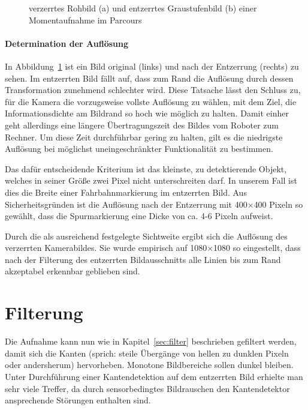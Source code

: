 \begin{figure}[htbp] %
  \centering
  \hfill
  \caption{verzerrtes Rohbild (a) und entzerrtes Graustufenbild (b) einer Momentaufnahme im Parcours}
\label{fig:bildvorverarbeitung_entzerren}
\end{figure} 

\paragraph{Determination der Auflösung}
In Abbildung~\ref{fig:bildvorverarbeitung_entzerren} ist ein Bild original (links) und nach der Entzerrung (rechts) zu sehen. Im entzerrten Bild fällt auf, dass zum Rand die Auflösung durch dessen Transformation zunehmend schlechter wird. Diese Tatsache lässt den Schluss zu, für die Kamera die vorzugsweise vollste Auflösung zu wählen, mit dem Ziel, die Informationsdichte am Bildrand so hoch wie möglich zu halten. Damit einher geht allerdings eine längere Übertragungszeit des Bildes vom Roboter zum Rechner. Um diese Zeit durchführbar gering zu halten, gilt es die niedrigste Auflösung bei möglichst uneingeschränkter Funktionalität zu bestimmen. 

Das dafür entscheidende Kriterium ist das kleinste, zu detektierende Objekt, welches in seiner Größe zwei Pixel nicht unterschreiten darf. In unserem Fall ist dies die Breite einer Fahrbahnmarkierung im entzerrten Bild. Aus Sicherheitsgründen ist die Auflösung nach der Entzerrung mit 400\( \times \)400 Pixeln so gewählt, dass die Spurmarkierung eine Dicke von ca. 4-6 Pixeln aufweist. 

Durch die als ausreichend festgelegte Sichtweite ergibt sich die Auflösung des verzerrten Kamerabildes. Sie wurde empirisch auf 1080\( \times \)1080 so eingestellt, dass nach der Filterung des entzerrten Bildausschnitts alle Linien bis zum Rand akzeptabel erkennbar geblieben sind.

\section{Filterung \dcfirstauthorshort}
\label{sec:bildvorverarbeitung:filterung}
Die Aufnahme kann nun wie in Kapitel~\ref{sec:filter} beschrieben gefiltert werden, damit sich die Kanten (sprich: steile Übergänge von hellen zu dunklen Pixeln oder andersherum) hervorheben. Monotone Bildbereiche sollen dunkel bleiben. Unter Durchführung einer Kantendetektion auf dem entzerrten Bild erhielte man sehr viele Treffer, da durch sensorbedingtes Bildrauschen den Kantendetektor ansprechende Störungen enthalten sind. 

